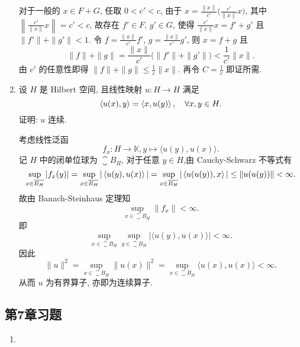\begin{enumerate}
\begin{answer}
      对于一般的 $x\in F+G$, 任取 $0<c'<c$, 由于 $x=\frac{\|x\|}{c'}\bigl(\frac{c'}{\|x\|}x\bigr)$,
      其中 $\left\|\frac{c'}{\|x\|}x\right\|=c'<c$, 故存在 $f'\in F$, $g'\in G$,
      使得 $\frac{c'}{\|x\|}x=f'+g'$ 且 $\|f'\|+\|g'\|<1$.
      令 $f=\frac{\|x\|}{c'}f'$, $g=\frac{\|x\|}{c'}g'$, 则
      $x=f+g$ 且
      \[\|f\|+\|g\|=\frac{\|x\|}{c'}\bigl(\|f'\|+\|g'\|\bigr)<\frac{1}{c'}\|x\|.\]
      由 $c'$ 的任意性即得 $\|f\|+\|g\|\leq\frac{1}{c}\|x\|$.
      再令 $C=\frac{1}{c}$ 即证所需.
    \end{answer}
  \item 设 $H$ 是 Hilbert 空间, 且线性映射 $u:H\to H$ 满足
  \[\left\langle u(x),y\right\rangle=\left\langle x,u(y)\right\rangle,\quad\forall x,y\in H.\]
  证明: $u$ 连续.
    \begin{answer}
      考虑线性泛函
      \[f_x:H\to\mathbb{K},y\mapsto\langle u(y),u(x)\rangle.\]
      记 $H$ 中的闭单位球为 $\closure{B_H}$, 对于任意 $y\in H$,由 Cauchy-Schwarz 不等式有
      \[\sup_{x\in\overline{B_H}}|f_x(y)|=\sup_{x\in\overline{B_H}}|\left\langle u(y),u(x)\right\rangle|=\sup_{x\in \overline{B_H}}|\left\langle u(u(y)),x\right\rangle|\leq\|u(u(y))\|<\infty.\]
      故由 Banach-Steinhaus 定理知
      \[\sup_{x\in \closure{B_H}}\|f_x\|<\infty.\]
      即
      \[\sup_{x\in \closure{B_H}}\sup_{y\in \closure{B_H}}|\langle u(y),u(x )\rangle|<\infty.\]
      因此
      \[\|u\|^2=\sup_{x\in\closure{B_H}}\|u(x)\|^2=\sup_{x\in \closure{B_H}}\langle u(x),u(x)\rangle<\infty.\]
      从而 $u$ 为有界算子, 亦即为连续算子.
    \end{answer}
\end{enumerate}




\subsection{第7章习题}
\begin{enumerate}
  \item 
\end{enumerate}


